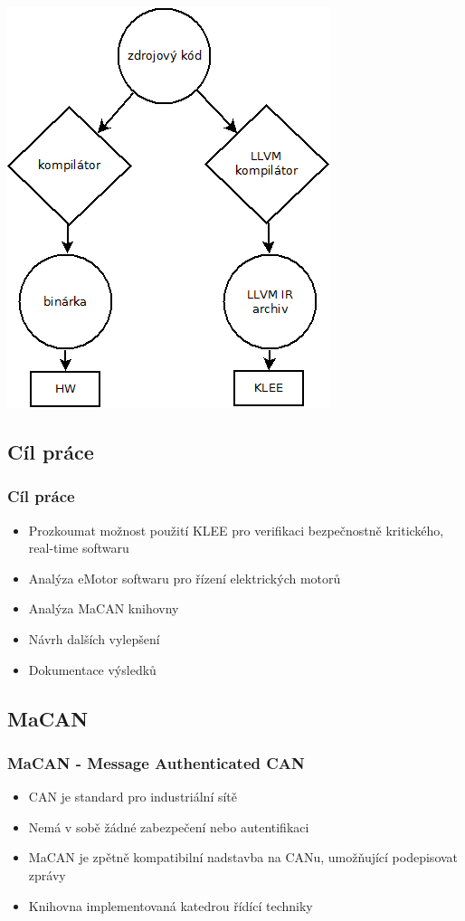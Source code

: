 \documentclass{beamer}
\begin{document}
\begin{frame}
\begin{center}
\includegraphics[scale=0.38]{kompilace.png}
\end{center}
\end{frame}

\subsection*{Cíl práce}
\begin{frame}
\frametitle{Cíl práce}
\begin{itemize}
    \item Prozkoumat možnost použití KLEE pro verifikaci bezpečnostně
    kritického, real-time softwaru
    \item Analýza eMotor softwaru pro řízení elektrických motorů
    \item Analýza MaCAN knihovny
    \item Návrh dalších vylepšení
    \vspace*{1cm}
    \item Dokumentace výsledků
\end{itemize}
\end{frame}

\subsection*{MaCAN}
\begin{frame}
\frametitle{MaCAN - Message Authenticated CAN}
\begin{itemize}
    \item CAN je standard pro industriální sítě
    \item Nemá v sobě žádné zabezpečení nebo autentifikaci
    \item MaCAN je zpětně kompatibilní nadstavba na CANu, umožňující
    podepisovat zprávy
    \item Knihovna implementovaná katedrou řídící techniky
\end{itemize}
\end{frame}
\end{document}
